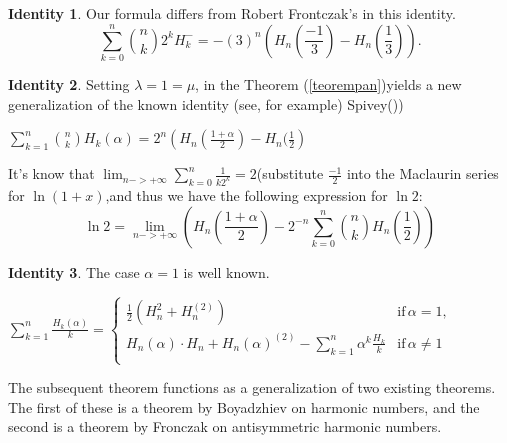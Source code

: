 \documentclass[a4paper,10pt,oneside]{article}
\theoremstyle{definition}
\newtheorem{identity2}{Identity}[section]
\theoremstyle{remark}
\newcommand{\idi}[1]{\begin{identity2}{#1}\end{identity2}}
\begin{document}
\idi{
Our formula differs from Robert Frontczak's in this identity.
$$\sum_{k=0}^n\binom{n}{k}2^kH_k^-=- (3)^n\left(H_n( \frac{-1}{3})-H_n( \frac{1}{3})\right).$$}
\idi{Setting $\lambda=1=\mu$, in  the Theorem (\ref{teorempan})yields a new generalization of the known identity 
 (see, for example) Spivey(\cite{spivey}))\par 
  $\sum_{k=1}^n\binom{n}{k}{H_{k}(\alpha)}={2^{n}}\left(H_n(\frac{1+\alpha}{2})-H_n(\frac{1}{2}\right)$\par
  It's know that $\lim_{n->+\infty}\sum_{k=0}^n\frac{1}{k2^k}=2$(substitute $\frac{-1}{2}$ into the Maclaurin series for $\ln(1+x)$,and thus we have the following expression for $\ln 2:$
$$ \ln 2=\lim_{n->+\infty}\left(H_n(\frac{1+\alpha}{2})-2^{-n}\sum_{k=0}^n\binom{n}{k}H_n(\frac{1}{2})\right)$$}
\idi{The case $\alpha=1 $ is well known. \par $\sum_{k=1}^n\frac{H_{k}(\alpha)}{k}=\begin{cases}\frac{1}{2}\left(H_n^2+H_n^{(2)}\right)&\text{if}\, \alpha=1,\\
H_n(\alpha)\cdot H_n+H_n(\alpha)^{(2)}-\sum_{k=1}^n\alpha^k\frac{H_k}{k}&\text{if}\, \alpha\ne 1\\ 
  \end{cases}$\par   }
\vspace{25pt}

{The subsequent theorem functions as a generalization of two existing theorems. The first of these is a theorem by Boyadzhiev on harmonic numbers, and the second is a theorem by Fronczak on antisymmetric harmonic numbers.}
\end{document}
